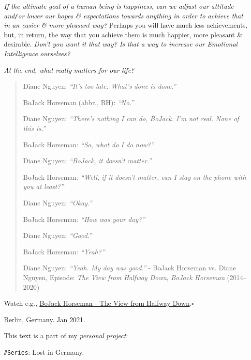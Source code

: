 \documentclass[12pt,oneside]{book}
\begin{document}
{\it If the ultimate goal of a human being is happiness, can we adjust our attitude and{\tt/}or lower our hopes \& expectations towards anything in order to achieve that in an easier \& more pleasant way?} Perhaps you will have much less achievements, but, in return, the way that you achieve them is much happier, more pleasant \& desirable. {\it Don't you want it that way? Is that a way to increase our Emotional Intelligence ourselves?}

{\it At the end, what really matters for our life?}
\begin{quote}
	{\sf Diane Nguyen}: {\it ``It's too late. What's done is done.''}
	
	{\sf BoJack Horseman} (abbr., BH): {\it ``No.''}
	
	{\sf Diane Nguyen}: {\it ``There's nothing I can do, BoJack. I'm not real. None of this is.''}
	
	{\sf BoJack Horseman}: {\it ``So, what do I do now?''}
	
	{\sf Diane Nguyen}: {\it ``BoJack, it doesn't matter.''}
	
	{\sf BoJack Horseman}: {\it ``Well, if it doesn't matter, can I stay on the phone with you at least?''}
	
	{\sf Diane Nguyen}: {\it ``Okay.''}
	
	{\sf BoJack Horseman}: {\it ``How was your day?''}
	
	{\sf Diane Nguyen}: {\it ``Good.''}
	
	{\sf BoJack Horseman}: {\it ``Yeah?''}
	
	{\sf Diane Nguyen}: {\it ``Yeah. My day was good.''} - BoJack Horseman vs. Diane Nguyen,  Episode: {\it The View from Halfway Down}, {\it BoJack Horseman} (2014--2020)
\end{quote}
Watch e.g., \href{https://www.youtube.com/watch?v=Pt21dU5Pu8g}{BoJack Horseman - The View from Halfway Down}.\hfill$\square$

\begin{flushright}
	{\sc Berlin, Germany}. Jan 2021.
	
	This text is a part of my {\it personal project}: 
	
	{\tt \#Series}: {\sc Lost in Germany}.
\end{flushright}
\end{document}
